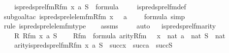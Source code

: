 \begin{isabellebody}
\ \ \ {\isachardoublequoteopen}is{\isacharunderscore}{\kern0pt}preds{\isacharunderscore}{\kern0pt}prel{\isacharunderscore}{\kern0pt}fm{\isacharparenleft}{\kern0pt}Rfm{\isacharcomma}{\kern0pt}\ x{\isacharcomma}{\kern0pt}\ a{\isacharcomma}{\kern0pt}\ S{\isacharparenright}{\kern0pt}\ {\isasymin}\ formula{\isachardoublequoteclose}\ \isanewline
%
\isadelimproof
\ \ %
\endisadelimproof
%
\isatagproof
{}\isamarkupfalse%
\ is{\isacharunderscore}{\kern0pt}preds{\isacharunderscore}{\kern0pt}prel{\isacharunderscore}{\kern0pt}fm{\isacharunderscore}{\kern0pt}def\ \isanewline
\ \ \isamarkupfalse%
{\isacharparenleft}{\kern0pt}subgoal{\isacharunderscore}{\kern0pt}tac\ {\isachardoublequoteopen}is{\isacharunderscore}{\kern0pt}preds{\isacharunderscore}{\kern0pt}prel{\isacharunderscore}{\kern0pt}elem{\isacharunderscore}{\kern0pt}fm{\isacharparenleft}{\kern0pt}Rfm{\isacharcomma}{\kern0pt}\ x\ {\isacharhash}{\kern0pt}{\isacharplus}{\kern0pt}\ {}{\isacharcomma}{\kern0pt}\ a\ {\isacharhash}{\kern0pt}{\isacharplus}{\kern0pt}\ {}{\isacharcomma}{\kern0pt}\ {}{\isacharparenright}{\kern0pt}\ {\isasymin}\ formula{\isachardoublequoteclose}{\isacharcomma}{\kern0pt}\ simp{\isacharparenright}{\kern0pt}\isanewline
\ \ \isamarkupfalse%
{\isacharparenleft}{\kern0pt}rule\ is{\isacharunderscore}{\kern0pt}preds{\isacharunderscore}{\kern0pt}prel{\isacharunderscore}{\kern0pt}elem{\isacharunderscore}{\kern0pt}fm{\isacharunderscore}{\kern0pt}type{\isacharparenright}{\kern0pt}\isanewline
\ \ \isamarkupfalse%
\ assms\ \isanewline
\ \ \isamarkupfalse%
\ auto%
\endisatagproof
{\isafoldproof}%
%
\isadelimproof
\ \isanewline
%
\endisadelimproof
\isanewline
{}\isamarkupfalse%
\ is{\isacharunderscore}{\kern0pt}preds{\isacharunderscore}{\kern0pt}prel{\isacharunderscore}{\kern0pt}fm{\isacharunderscore}{\kern0pt}arity\ {\isacharcolon}{\kern0pt}\ \isanewline
\ \ \ R\ Rfm\ x\ a\ S\ \isanewline
\ \ \ {\isachardoublequoteopen}Rfm\ {\isasymin}\ formula{\isachardoublequoteclose}\ {\isachardoublequoteopen}arity{\isacharparenleft}{\kern0pt}Rfm{\isacharparenright}{\kern0pt}\ {\isacharequal}{\kern0pt}\ {}{\isachardoublequoteclose}\ {\isachardoublequoteopen}x\ {\isasymin}\ nat{\isachardoublequoteclose}\ {\isachardoublequoteopen}a\ {\isasymin}\ nat{\isachardoublequoteclose}\ {\isachardoublequoteopen}S\ {\isasymin}\ nat{\isachardoublequoteclose}\ \isanewline
\ \ \ {\isachardoublequoteopen}arity{\isacharparenleft}{\kern0pt}is{\isacharunderscore}{\kern0pt}preds{\isacharunderscore}{\kern0pt}prel{\isacharunderscore}{\kern0pt}fm{\isacharparenleft}{\kern0pt}Rfm{\isacharcomma}{\kern0pt}\ x{\isacharcomma}{\kern0pt}\ a{\isacharcomma}{\kern0pt}\ S{\isacharparenright}{\kern0pt}{\isacharparenright}{\kern0pt}\ {\isasymle}\ succ{\isacharparenleft}{\kern0pt}x{\isacharparenright}{\kern0pt}\ {\isasymunion}\ succ{\isacharparenleft}{\kern0pt}a{\isacharparenright}{\kern0pt}\ {\isasymunion}\ succ{\isacharparenleft}{\kern0pt}S{\isacharparenright}{\kern0pt}{\isachardoublequoteclose}\isanewline

\end{isabellebody}
